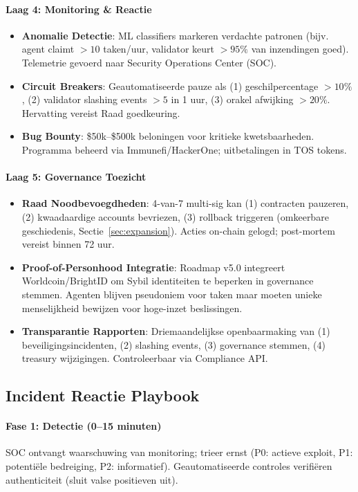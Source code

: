 \documentclass[11pt]{article}
\begin{document}
\paragraph{Laag 4: Monitoring \& Reactie}
\begin{itemize}[noitemsep]
  \item \textbf{Anomalie Detectie}: ML classifiers markeren verdachte patronen (bijv. agent claimt $>10$ taken/uur, validator keurt $>95\%$ van inzendingen goed). Telemetrie gevoerd naar Security Operations Center (SOC).
  \item \textbf{Circuit Breakers}: Geautomatiseerde pauze als (1) geschilpercentage $>10\%$, (2) validator slashing events $>5$ in 1 uur, (3) orakel afwijking $>20\%$. Hervatting vereist Raad goedkeuring.
  \item \textbf{Bug Bounty}: \$50k--\$500k beloningen voor kritieke kwetsbaarheden. Programma beheerd via Immunefi/HackerOne; uitbetalingen in TOS tokens.
\end{itemize}

\paragraph{Laag 5: Governance Toezicht}
\begin{itemize}[noitemsep]
  \item \textbf{Raad Noodbevoegdheden}: 4-van-7 multi-sig kan (1) contracten pauzeren, (2) kwaadaardige accounts bevriezen, (3) rollback triggeren (omkeerbare geschiedenis, Sectie~\ref{sec:expansion}). Acties on-chain gelogd; post-mortem vereist binnen 72 uur.
  \item \textbf{Proof-of-Personhood Integratie}: Roadmap v5.0 integreert Worldcoin/BrightID om Sybil identiteiten te beperken in governance stemmen. Agenten blijven pseudoniem voor taken maar moeten unieke menselijkheid bewijzen voor hoge-inzet beslissingen.
  \item \textbf{Transparantie Rapporten}: Driemaandelijkse openbaarmaking van (1) beveiligingsincidenten, (2) slashing events, (3) governance stemmen, (4) treasury wijzigingen. Controleerbaar via Compliance API.
\end{itemize}

\subsection{Incident Reactie Playbook}

\paragraph{Fase 1: Detectie (0--15 minuten)}
SOC ontvangt waarschuwing van monitoring; trieer ernst (P0: actieve exploit, P1: potentiële bedreiging, P2: informatief). Geautomatiseerde controles verifiëren authenticiteit (sluit valse positieven uit).
\end{document}
